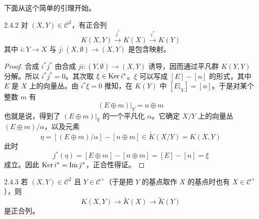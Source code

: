 下面从这个简单的引理开始。

\begin{lemma*}{2.4.2}
  对 $(X,Y)\in\mathcal{C}^2$，有正合列
  \[
  K(X,Y)\xrightarrow{j^*}K(X)\xrightarrow{i^*}K(Y)
  \]
  其中 $i\colon Y\to X$ 与 $j\colon(X,\emptyset)\to(X,Y)$ 是包含映射。
\end{lemma*}

\begin{proof}
  合成 $i^*j^*$ 由合成 $ji\colon(Y,\emptyset)\to(X,Y)$ 诱导，因而通过平凡群 $K(Y,Y)$ 分解。所以 $i^*j^*=0$。其次取 $\xi\in\operatorname{Ker} i^*$。$\xi$ 可以写成 $[E]-[n]$ 的形式，其中 $E$ 是 $X$ 上的向量丛。由 $i^*\xi=0$ 推知，在 $K(Y)$ 中 $[E|_Y]=[n]$。于是对某个整数 $m$ 有
  \[
  (E\oplus m)|_Y=n\oplus m
  \]
  也就是说，得到了 $(E\oplus m)|_Y$ 的一个平凡化 $\alpha$。它确定 $X/Y$ 上的向量丛 $(E\oplus m)/\alpha$，以及元素
  \[
  \eta=[(E\oplus m)/\alpha]-[n\oplus m]\in\tilde K(X/Y)=K(X,Y)
  \]
  此时
  \[
  j^*(\eta)=[E\oplus m]-[n\oplus m]=[E]-[n]=\xi
  \]
  成立。因此 $\operatorname{Ker} i^*=\operatorname{Im} j^*$，正合性得证。
\end{proof}


\begin{corollary*}{2.4.3}
  若 $(X,Y)\in\mathcal{C}^2$ 且 $Y\in\mathcal{C}^+$（于是把 $Y$ 的基点取作 $X$ 的基点时也有 $X\in\mathcal{C}^+$），则
  \[
  K(X,Y)\longrightarrow\tilde K(X)\longrightarrow\tilde K(Y)
  \]
  是正合列。
\end{corollary*}

